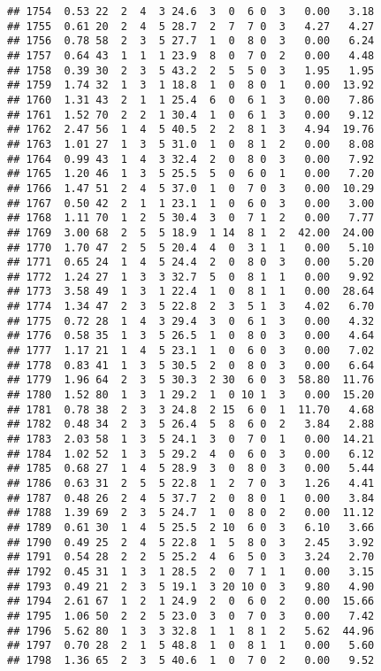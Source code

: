 \documentclass[
]{article}
\begin{document}
\begin{verbatim}
## 1754  0.53 22  2  4  3 24.6  3  0  6 0  3   0.00   3.18
## 1755  0.61 20  2  4  5 28.7  2  7  7 0  3   4.27   4.27
## 1756  0.78 58  2  3  5 27.7  1  0  8 0  3   0.00   6.24
## 1757  0.64 43  1  1  1 23.9  8  0  7 0  2   0.00   4.48
## 1758  0.39 30  2  3  5 43.2  2  5  5 0  3   1.95   1.95
## 1759  1.74 32  1  3  1 18.8  1  0  8 0  1   0.00  13.92
## 1760  1.31 43  2  1  1 25.4  6  0  6 1  3   0.00   7.86
## 1761  1.52 70  2  2  1 30.4  1  0  6 1  3   0.00   9.12
## 1762  2.47 56  1  4  5 40.5  2  2  8 1  3   4.94  19.76
## 1763  1.01 27  1  3  5 31.0  1  0  8 1  2   0.00   8.08
## 1764  0.99 43  1  4  3 32.4  2  0  8 0  3   0.00   7.92
## 1765  1.20 46  1  3  5 25.5  5  0  6 0  1   0.00   7.20
## 1766  1.47 51  2  4  5 37.0  1  0  7 0  3   0.00  10.29
## 1767  0.50 42  2  1  1 23.1  1  0  6 0  3   0.00   3.00
## 1768  1.11 70  1  2  5 30.4  3  0  7 1  2   0.00   7.77
## 1769  3.00 68  2  5  5 18.9  1 14  8 1  2  42.00  24.00
## 1770  1.70 47  2  5  5 20.4  4  0  3 1  1   0.00   5.10
## 1771  0.65 24  1  4  5 24.4  2  0  8 0  3   0.00   5.20
## 1772  1.24 27  1  3  3 32.7  5  0  8 1  1   0.00   9.92
## 1773  3.58 49  1  3  1 22.4  1  0  8 1  1   0.00  28.64
## 1774  1.34 47  2  3  5 22.8  2  3  5 1  3   4.02   6.70
## 1775  0.72 28  1  4  3 29.4  3  0  6 1  3   0.00   4.32
## 1776  0.58 35  1  3  5 26.5  1  0  8 0  3   0.00   4.64
## 1777  1.17 21  1  4  5 23.1  1  0  6 0  3   0.00   7.02
## 1778  0.83 41  1  3  5 30.5  2  0  8 0  3   0.00   6.64
## 1779  1.96 64  2  3  5 30.3  2 30  6 0  3  58.80  11.76
## 1780  1.52 80  1  3  1 29.2  1  0 10 1  3   0.00  15.20
## 1781  0.78 38  2  3  3 24.8  2 15  6 0  1  11.70   4.68
## 1782  0.48 34  2  3  5 26.4  5  8  6 0  2   3.84   2.88
## 1783  2.03 58  1  3  5 24.1  3  0  7 0  1   0.00  14.21
## 1784  1.02 52  1  3  5 29.2  4  0  6 0  3   0.00   6.12
## 1785  0.68 27  1  4  5 28.9  3  0  8 0  3   0.00   5.44
## 1786  0.63 31  2  5  5 22.8  1  2  7 0  3   1.26   4.41
## 1787  0.48 26  2  4  5 37.7  2  0  8 0  1   0.00   3.84
## 1788  1.39 69  2  3  5 24.7  1  0  8 0  2   0.00  11.12
## 1789  0.61 30  1  4  5 25.5  2 10  6 0  3   6.10   3.66
## 1790  0.49 25  2  4  5 22.8  1  5  8 0  3   2.45   3.92
## 1791  0.54 28  2  2  5 25.2  4  6  5 0  3   3.24   2.70
## 1792  0.45 31  1  3  1 28.5  2  0  7 1  1   0.00   3.15
## 1793  0.49 21  2  3  5 19.1  3 20 10 0  3   9.80   4.90
## 1794  2.61 67  1  2  1 24.9  2  0  6 0  2   0.00  15.66
## 1795  1.06 50  2  2  5 23.0  3  0  7 0  3   0.00   7.42
## 1796  5.62 80  1  3  3 32.8  1  1  8 1  2   5.62  44.96
## 1797  0.70 28  2  1  5 48.8  1  0  8 1  1   0.00   5.60
## 1798  1.36 65  2  3  5 40.6  1  0  7 0  2   0.00   9.52

\end{verbatim}
\end{document}

